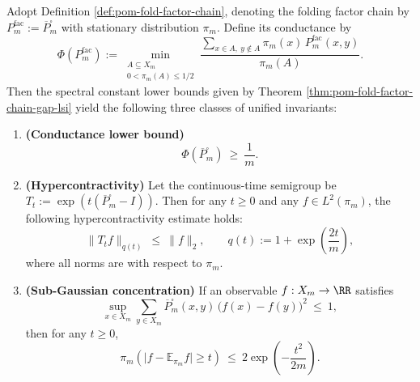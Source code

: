 \begin{corollary}\label{cor:pom-fold-factor-chain-derived-invariants}
Adopt Definition \ref{def:pom-fold-factor-chain}, denoting the folding factor chain by \(P^{\mathrm{fac}}_m:=\overline P^{\square}_m\) with stationary distribution \(\pi_m\).
Define its conductance by
\[
\Phi(P^{\mathrm{fac}}_m)
:=\min_{\substack{A\subseteq X_m\\0<\pi_m(A)\le 1/2}}
\frac{\sum_{x\in A,\ y\notin A}\pi_m(x)\,P^{\mathrm{fac}}_m(x,y)}{\pi_m(A)}.
\]
Then the spectral constant lower bounds given by Theorem \ref{thm:pom-fold-factor-chain-gap-lsi} yield the following three classes of unified invariants:
\begin{enumerate}
  \item \textbf{(Conductance lower bound)}
  \[
  \Phi(\overline P^{\square}_m)\ \ge\ \frac{1}{m}.
  \]
  \item \textbf{(Hypercontractivity)} Let the continuous-time semigroup be
  \(
  T_t:=\exp(t(\overline P^{\square}_m-I))
  \).
  Then for any \(t\ge 0\) and any \(f\in L^2(\pi_m)\), the following hypercontractivity estimate holds:
  \[
  \|T_t f\|_{q(t)}\ \le\ \|f\|_2,
  \qquad
  q(t):=1+\exp\!\left(\frac{2t}{m}\right),
  \]
  where all norms are with respect to \(\pi_m\).
  \item \textbf{(Sub-Gaussian concentration)} If an observable \(f:X_m\to\RR\) satisfies
  \[
  \sup_{x\in X_m}\sum_{y\in X_m}\overline P^{\square}_m(x,y)\,\bigl(f(x)-f(y)\bigr)^2\ \le\ 1,
  \]
  then for any \(t\ge 0\),
  \[
  \pi_m\!\left(\bigl|f-\mathbb E_{\pi_m}f\bigr|\ge t\right)
  \ \le\ 2\exp\!\left(-\frac{t^2}{2m}\right).
  \]
\end{enumerate}
\end{corollary}

